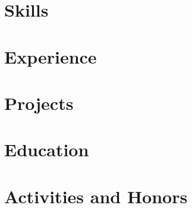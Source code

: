 \documentclass[letter,10pt]{article}
\begin{document}
% 

\section{Skills}


\section{Experience}


\section{Projects}


\section{Education}



\section{Activities and Honors}

\end{document}
